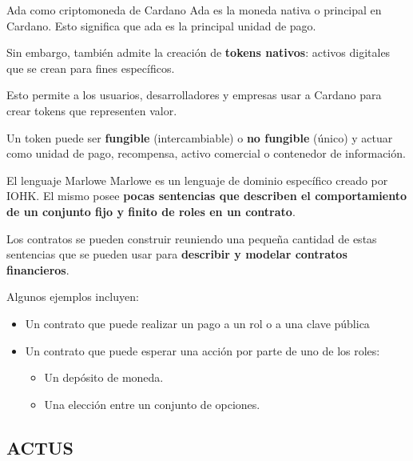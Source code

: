 \documentclass{beamer}
\begin{document}
\begin{frame}{Ada como criptomoneda de Cardano}
Ada es la moneda nativa o principal en Cardano. Esto significa que ada es la principal unidad de pago.

\pause
\vfill

Sin embargo, también admite la creación de \textbf{tokens nativos}: activos digitales que se crean para fines
específicos. 

\vfill
\pause

Esto permite a los usuarios, desarrolladores y empresas usar a Cardano para crear tokens que representen valor.

\pause
\vfill

Un token puede ser \textbf{fungible} (intercambiable) o \textbf{no fungible} (único) y actuar como unidad de pago, recompensa, activo comercial o contenedor de información.

\end{frame}

\begin{frame}{El lenguaje Marlowe}
    Marlowe es un lenguaje de dominio específico creado por IOHK. El mismo posee \textbf{pocas sentencias que describen el comportamiento de un conjunto fijo y finito de roles en un contrato}.

\vfill
Los contratos se pueden construir reuniendo una pequeña cantidad de estas sentencias que se pueden usar para \textbf{describir y modelar contratos financieros}. 
\vfill

\pause
Algunos ejemplos incluyen:
\begin{itemize}
    \item Un contrato que puede realizar un pago a un rol o a una clave pública
    \item Un contrato que puede esperar una acción por parte de uno de los roles:
        \begin{itemize}
            \item Un depósito de moneda.
            \item Una elección entre un conjunto de opciones.
        \end{itemize}
\end{itemize}

\end{frame}



\subsection{ACTUS}
\end{document}
